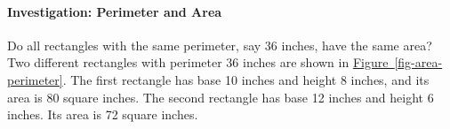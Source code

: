 \documentclass[10pt,]{book}
\theoremstyle{plain}
\theoremstyle{definition}
\theoremstyle{definition}
\theoremstyle{definition}
\theoremstyle{definition}
\theoremstyle{definition}
\numberwithin{equation}{section}
\newcommand{\hrulethin}  {\noalign{\hrule height 0.04em}}
\newcommand{\hrulethick} {\noalign{\hrule height 0.11em}}
\newcounter{figstack}
\newcounter{figindex}
\newlength\fight
\newcommand\pushValignCaptionBottom[5][b]{%
\stepcounter{figstack}%
\expandafter\def\csname %
figalign\romannumeral\value{figstack}\endcsname{#1}%
\expandafter\def\csname %
figtype\romannumeral\value{figstack}\endcsname{#2}%
\expandafter\def\csname %
figwd\romannumeral\value{figstack}\endcsname{#3}%
\expandafter\def\csname %
figcontent\romannumeral\value{figstack}\endcsname{#4}%
\expandafter\def\csname %
figcap\romannumeral\value{figstack}\endcsname{#5}%
\setbox0=\hbox{%
\begin{#2}{#3}#4\end{#2}}%
\ifdim\dimexpr\ht0+\dp0\relax>\fight\global\setlength{\fight}{%
\dimexpr\ht0+\dp0\relax}\fi%
}
\newcommand\popValignCaptionBottom{%
\setcounter{figindex}{0}%
\hfill%
\whiledo{\value{figindex}<\value{figstack}}{%
\stepcounter{figindex}%
\def\tmp{\csname figwd\romannumeral\value{figindex}\endcsname}%
\begin{\csname figtype\romannumeral\value{figindex}\endcsname}[t]{\tmp}%
\centering%
\stackinset{c}{}%
{\csname figalign\romannumeral\value{figindex}\endcsname}{}%
{\csname figcontent\romannumeral\value{figindex}\endcsname}%
{\rule{0pt}{\fight}}\par%
\csname figcap\romannumeral\value{figindex}\endcsname%
\end{\csname figtype\romannumeral\value{figindex}\endcsname}%
\hfill%
}%
\setcounter{figstack}{0}%
\setlength{\fight}{0pt}%
\hfill%
}
\begin{document}
\paragraph[Investigation: Perimeter and Area]{Investigation: Perimeter and Area}\label{paragraphs-20}

            Do all rectangles with the same perimeter, say 36 inches, have the same area? Two different rectangles with perimeter 36 inches are shown in \hyperref[fig-area-perimeter]{Figure~\ref{fig-area-perimeter}}. The first rectangle has base 10 inches and height 8 inches, and its area is 80 square inches. The second rectangle has base 12 inches and height 6 inches. Its area is 72 square inches.
\leavevmode%
\end{document}
